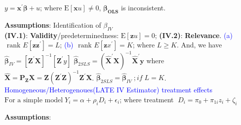 \documentclass[
]{article}
\begin{document}
\(y=\mathbf{x}^{\prime} \boldsymbol{\beta}+u\); where
\(\mathrm{E}[\mathbf{x} u]\neq 0\), \(\boldsymbol{\beta_{OLS}}\) is
inconsistent.

\textbf{Assumptions}: Identification of \(\beta_{IV}\)\\

\textbf{(IV.1)}: \textbf{Validity}/predeterminedness:
\(\mathrm{E}[\mathbf{z} u]=0\); \textbf{(IV.2)}: \textbf{Relevance}.
\textcolor{blue}{(a)}
\(\text { rank } E\left[\mathbf{z z}^{\prime}\right]=L\);
\textcolor{blue}{(b)}
\(\text { rank } E\left[\mathbf{z} x^{\prime}\right]=K\); where
\(L \geqslant K\). And, we have
\(\widehat{\boldsymbol{\beta}}_{I V}=\left[\mathbf{Z^\prime} \mathbf{X}\right]^{-1} [\mathbf{Z^\prime} y]\)
\(\widehat{\boldsymbol{\beta}}_{2SLS}=\left(\hat{\mathbf{X}}^{\prime} \mathbf{X}\right)^{-1} \hat{\mathbf{X}}^{\prime}{\mathbf{y}}\)
where
\(\hat{\mathbf{X}}=\mathrm{\mathbf{P_Z X}}= \mathbf{Z}\left(\mathbf{Z}^{\prime} \mathbf{Z}\right)^{-1} \mathbf{Z}^{\prime} \mathbf{X}\).
\(\widehat{\boldsymbol{\beta}}_{2SLS} = \widehat{\boldsymbol{\beta}}_{IV}\;; if \; L = K\).\\
\textcolor{blue}{Homogeneous/Heterogenoues(LATE IV Estimator) treatment effects}\\
\(\text{For a simple model}\; Y_{i}=\alpha+\rho_{i} D_{i}+\epsilon_{i}\);
where treatment \(\;D_{i}=\pi_{0}+\pi_{1 i} z_{i}+\zeta_{i}\)

\textbf{Assumptions}:
\end{document}
